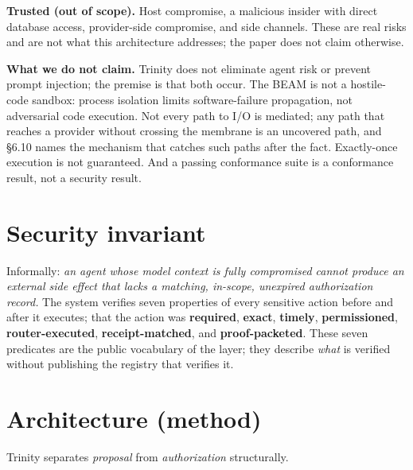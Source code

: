 \documentclass[11pt]{article}
\begin{document}
\textbf{Trusted (out of scope).} Host compromise, a malicious insider with direct database
access, provider-side compromise, and side channels. These are real risks and are not what
this architecture addresses; the paper does not claim otherwise.

\textbf{What we do not claim.} Trinity does not eliminate agent risk or prevent prompt injection;
the premise is that both occur. The BEAM is not a hostile-code sandbox: process isolation
limits software-failure propagation, not adversarial code execution. Not every path to I/O
is mediated; any path that reaches a provider without crossing the membrane is an uncovered
path, and \S6.10 names the mechanism that catches such paths after the fact. Exactly-once
execution is not guaranteed. And a passing conformance suite is a conformance result, not a
security result.

\section{Security invariant}\label{security-invariant}

Informally: \emph{an agent whose model context is fully compromised cannot produce an external
side effect that lacks a matching, in-scope, unexpired authorization record.} The system
verifies seven properties of every sensitive action before and after it executes; that the
action was \textbf{required}, \textbf{exact}, \textbf{timely}, \textbf{permissioned}, \textbf{router-executed},
\textbf{receipt-matched}, and \textbf{proof-packeted}. These seven predicates are the public
vocabulary of the layer; they describe \emph{what} is verified without publishing the registry
that verifies it.

\section{Architecture (method)}\label{architecture-method}

Trinity separates \emph{proposal} from \emph{authorization} structurally.
\end{document}
